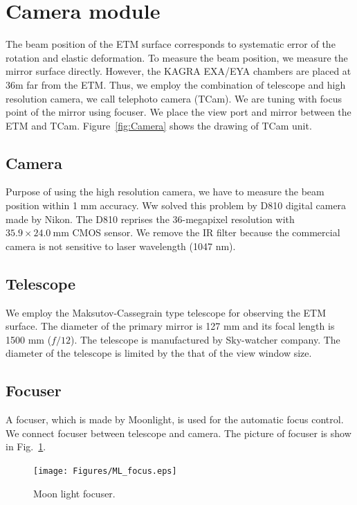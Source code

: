 
\section{Camera module}
The beam position of the ETM surface corresponds to systematic error of the rotation and elastic deformation. To measure the beam position, we measure the mirror surface directly. However, the KAGRA EXA/EYA chambers are placed at 36m far from the ETM. Thus, we employ the combination of telescope and high resolution camera, we call telephoto camera (TCam). We are tuning with focus point of the mirror using focuser.  We place the view port and mirror between the ETM and TCam. Figure~\ref{fig:Camera} shows the drawing of TCam unit.
\subsection{Camera}
Purpose of using the high resolution camera, we have to measure the beam position within 1 mm accuracy. Ww solved this problem by D810 digital camera made by Nikon. The D810 reprises the 36-megapixel resolution with $35.9 \times 24.0~\mathrm{mm}$ CMOS sensor. We remove the IR filter because the commercial camera is not sensitive to laser wavelength (1047 nm).
\subsection{Telescope}
We employ the Maksutov-Cassegrain type telescope for observing the ETM surface. The diameter of the primary mirror is 127 mm and its focal length is 1500 mm ($f/12$). The telescope is manufactured by Sky-watcher company. The diameter of the telescope is limited by the that of the view window size. 
\subsection{Focuser}
A focuser, which is made by Moonlight, is used for the automatic focus control. 
We connect focuser between telescope and camera. 
The picture of focuser is show in Fig.~\ref{fig:ML_focus}.

\begin{figure}
\begin{center}
\texttt{[image: Figures/ML\_focus.eps]}
\caption{Moon light focuser.}
\label{fig:ML_focus} 
\end{center}
\end{figure}


